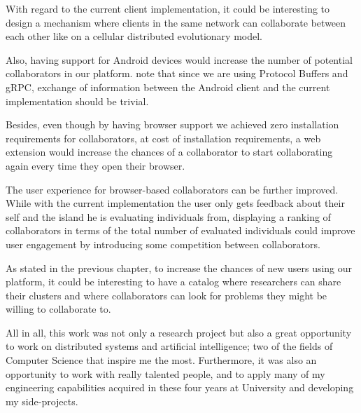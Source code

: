 With regard to the current client implementation, it could be interesting to design a mechanism where clients in the same network can collaborate between each other like on a cellular distributed evolutionary model. 

Also, having support for Android devices would increase the number of potential collaborators in our platform. note that since we are using Protocol Buffers and gRPC, exchange of information between the Android client and the current implementation should be trivial. 

Besides, even though by having browser support we achieved zero installation requirements for collaborators, at cost of installation requirements, a web extension would increase the chances of a collaborator to start collaborating again every time they open their browser.

The user experience for browser-based collaborators can be further improved. While with the current implementation the user only gets feedback about their self and the island he is evaluating individuals from, displaying a ranking of collaborators in terms of the total number of evaluated individuals could improve user engagement by introducing some competition between collaborators. 

As stated in the previous chapter, to increase the chances of new users using our platform, it could be interesting to have a catalog where researchers can share their clusters and where collaborators can look for problems they might be willing to collaborate to.

All in all, this work was not only a research project but also a great opportunity to work on distributed systems and artificial intelligence; two of the fields of Computer Science that inspire me the most. Furthermore, it was also an opportunity to work with really talented people, and to apply many of my engineering capabilities acquired in these four years at University and developing my side-projects.